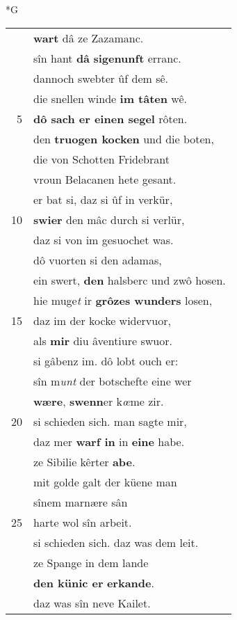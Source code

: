 \documentclass[8pt,a4paper,notitlepage]{article}
\begin{document}
\newpage
\begin{table}[ht]
\begin{minipage}[t]{0.5\linewidth}
\small
\begin{center}*G
\end{center}
\begin{tabular}{rl}
 & \textbf{wart} dâ ze Zazamanc.\\ 
 & sîn hant \textbf{dâ} \textbf{sigenunft} erranc.\\ 
 & dannoch swebter ûf dem sê.\\ 
 & die snellen winde \textbf{im tâten} wê.\\ 
5 & \textbf{dô sach er einen segel} rôten.\\ 
 & den \textbf{truogen kocken} und die boten,\\ 
 & die von Schotten Fridebrant\\ 
 & vroun Belacanen hete gesant.\\ 
 & er bat si, daz si ûf in verkür,\\ 
10 & \textbf{swier} den mâc durch si verlür,\\ 
 & daz si von im gesuochet was.\\ 
 & dô vuorten si den adamas,\\ 
 & ein swert, \textbf{den} halsberc und zwô hosen.\\ 
 & hie muge\textit{t} ir \textbf{grôzes wunders} losen,\\ 
15 & daz im der kocke widervuor,\\ 
 & als \textbf{mir} diu âventiure swuor.\\ 
 & si gâbenz im. dô lobt ouch er:\\ 
 & sîn m\textit{unt} der botschefte eine wer\\ 
 & \textbf{wære}, \textbf{swenn}er k\textit{œ}me zir.\\ 
20 & si schieden sich. man sagte mir,\\ 
 & daz mer \textbf{warf in} in \textbf{eine} habe.\\ 
 & ze Sibilie kêrter \textbf{abe}.\\ 
 & mit golde galt der küene man\\ 
 & sînem marnære sân\\ 
25 & harte wol sîn arbeit.\\ 
 & si schieden sich. daz was dem leit.\\ 
 & ze Spange in dem lande\\ 
 & \textbf{den künic er} \textbf{erkande}.\\ 
 & daz was sîn neve Kailet.\\ 

\end{tabular}
\end{minipage}
\end{table}
\end{document}
